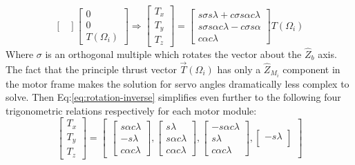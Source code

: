 {\begin{subequations}
\begin{equation}
\begin{bmatrix}
\end{bmatrix}
\begin{bmatrix}
0\\
0\\
T(\Omega_i)
\end{bmatrix}
\end{equation}
\begin{equation}\label{eq:rotation-inverse}
\Rightarrow
\begin{bmatrix}
T_x\\
T_y\\
T_z
\end{bmatrix}
=\begin{bmatrix}
s\sigma s\lambda + c\sigma s\alpha c\lambda\\
s\sigma s\alpha c\lambda - c\sigma s\alpha\\
c\alpha c\lambda
\end{bmatrix}
T(\Omega_i)
\end{equation}
\end{subequations}
Where $\sigma$ is an orthogonal multiple which rotates the vector about the $\hat{Z}_b$ axis. The fact that the principle thrust vector $\vec{T}(\Omega_i)$ has only a $\hat{Z}_{M_i}$ component in the motor frame makes the solution for servo angles dramatically less complex to solve. Then Eq:\ref{eq:rotation-inverse} simplifies even further to the following four trigonometric relations respectively for each motor module:
\begin{equation}
\begin{bmatrix}
T_x\\
T_y\\
T_z
\end{bmatrix}
=
\begin{bmatrix}
\begin{bmatrix}
s\alpha c\lambda\\
-s\lambda \\
c\alpha c\lambda
\end{bmatrix}
,
\begin{bmatrix}
s\lambda\\
s\alpha c\lambda\\
c\alpha c\lambda
\end{bmatrix}
,
\begin{bmatrix}
-s\alpha c\lambda\\
s\lambda\\
c\alpha c\lambda
\end{bmatrix}
,
\begin{bmatrix}
-s\lambda\\

\end{bmatrix}
\end{bmatrix}
\end{equation}}
